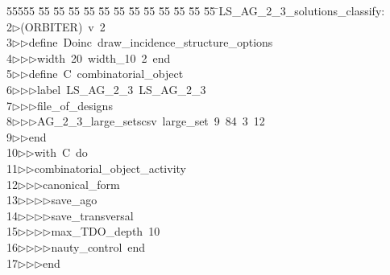 %
%
\begin{tabbing}
55555 \= 55 \= 55 \= 55 \= 55 \= 55 \= 55 \= 55 \= 55 \= 55 \= 55 \= 55 \= 55 \= \>LS\_AG\_2\_3\_solutions\_classify:\\[0pt]
2\>$\triangleright$\>(ORBITER)\ v\ 2\ \\[0pt]
3\>$\triangleright$\>$\triangleright$\>define\ Doinc\ draw\_incidence\_structure\_options\ \\[0pt]
4\>$\triangleright$\>$\triangleright$\>$\triangleright$\>width\ 20\ width\_10\ 2\ end\ \\[0pt]
5\>$\triangleright$\>$\triangleright$\>define\ C\ combinatorial\_object\ \\[0pt]
6\>$\triangleright$\>$\triangleright$\>$\triangleright$\>label\ LS\_AG\_2\_3\ LS\_AG\_2\_3\ \\[0pt]
7\>$\triangleright$\>$\triangleright$\>$\triangleright$\>file\_of\_designs\ \\[0pt]
8\>$\triangleright$\>$\triangleright$\>$\triangleright$\>AG\_2\_3\_large\_setscsv\ large\_set\ 9\ 84\ 3\ 12\ \\[0pt]
9\>$\triangleright$\>$\triangleright$\>end\ \\[0pt]
10\>$\triangleright$\>$\triangleright$\>with\ C\ do\ \\[0pt]
11\>$\triangleright$\>$\triangleright$\>combinatorial\_object\_activity\ \\[0pt]
12\>$\triangleright$\>$\triangleright$\>$\triangleright$\>canonical\_form\ \\[0pt]
13\>$\triangleright$\>$\triangleright$\>$\triangleright$\>$\triangleright$\>save\_ago\ \\[0pt]
14\>$\triangleright$\>$\triangleright$\>$\triangleright$\>$\triangleright$\>save\_transversal\ \\[0pt]
15\>$\triangleright$\>$\triangleright$\>$\triangleright$\>$\triangleright$\>max\_TDO\_depth\ 10\ \\[0pt]
16\>$\triangleright$\>$\triangleright$\>$\triangleright$\>$\triangleright$\>nauty\_control\ end\ \\[0pt]
17\>$\triangleright$\>$\triangleright$\>$\triangleright$\>end\ \\[0pt]

\end{tabbing}
